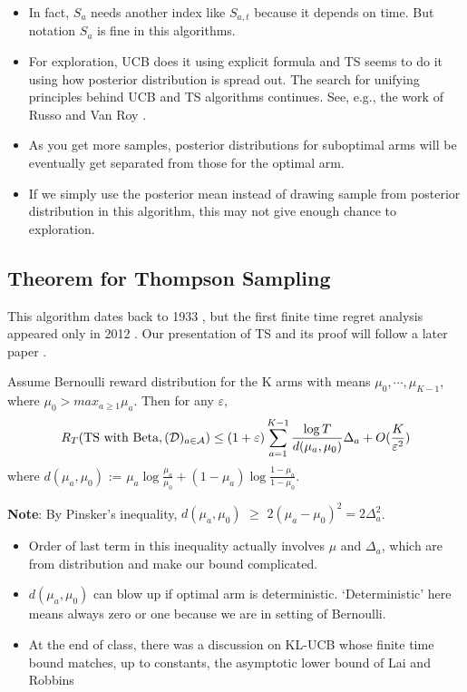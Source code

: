 \documentclass[11pt]{article}
\begin{document}
\begin{itemize}
	\item In fact, $S_a$ needs another index like $S_{a, t}$ because it depends on time. But notation $S_a$ is fine in this algorithms.
	\item For exploration, UCB does it using explicit formula and TS seems to do it using how posterior distribution is spread out. The search for unifying principles behind UCB and TS algorithms continues. See, e.g., the work of Russo and Van Roy \cite{russo2014learning}. 
	\item As you get more samples, posterior distributions for suboptimal arms will be eventually get separated from those for the optimal arm.
	\item If we simply use the posterior mean instead of drawing sample from posterior distribution in this algorithm, this may not give enough chance to exploration.
\end{itemize}

\subsection{Theorem for Thompson Sampling}
This algorithm dates back to 1933 \cite{thompson1933likelihood}, but the first finite time regret analysis appeared only in 2012 \cite{agrawal2012analysis}. Our presentation of TS and its proof will follow a later paper \cite{agrawal2013further}.
\begin{theorem}
	Assume Bernoulli reward distribution for the K arms with means $\mu_0,\cdots,\mu_{K-1}$, where $\mu_0 > max_{a \geq 1}\mu_a$. Then for any $\varepsilon$, 
	\begin{align*}
	R_T(\text{TS with Beta},(\mathcal{D})_{a\in\mathcal{A}} ) \leq (1+\varepsilon)\sum_{a=1}^{K-1}\frac{\log{T}}{d(\mu_a,\mu_0)}\Delta_a +O(\frac{K}{\varepsilon^2})
	\end{align*}
	where $d(\mu_a, \mu_0)$ := $\mu_a \log{\frac{\mu_a}{\mu_0}}+(1-\mu_a)\log{\frac{1-\mu_a}{1-\mu_0}}$.
\end{theorem}
\noindent \textbf{Note}: By Pinsker's inequality, $d(\mu_a, \mu_0)$ $\geq$ $2(\mu_a - \mu_0)^2=2\Delta_a^2$. 
\begin{itemize}
	\item Order of last term in this inequality actually involves $\mu$ and $\Delta_a$, which are from distribution and make our bound complicated.
	\item $d(\mu_a,\mu_0)$ can blow up if optimal arm is deterministic. `Deterministic' here means always zero or one because we are in setting of Bernoulli. 
	\item At the end of class, there was a discussion on KL-UCB \cite{garivier2011kl} whose finite time bound matches, up to constants, the asymptotic lower bound of Lai and Robbins \cite{lai1985asymptotically}
\end{itemize}

		

\end{document}
